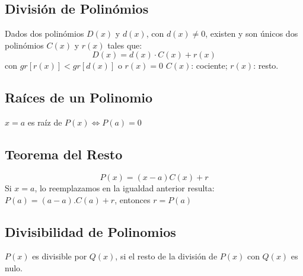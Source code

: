     \subsection{Divisi\'on de Polin\'omios}
    Dados dos polin\'omios $D(x)$ y $d(x)$, con $d(x) \neq 0$, existen y son \'unicos dos polin\'omios $C(x)$ y $r(x)$ tales que: 
     \[ D(x)=d(x) \cdot C(x) + r(x) \]
     con $gr[r(x)] < gr[d(x)]$ o $r(x) = 0$ \newline
     $C(x)$: cociente; $r(x)$: resto.

   \subsection{Ra\'ices de un Polinomio}
   $x=a$ es ra\'iz de $P(x) \Leftrightarrow P(a)=0$ 
   
   \subsection{Teorema del Resto}   
    
    \[ P(x) = (x - a)  C(x) + r \]
    Si $x = a$, lo reemplazamos en la igualdad anterior resulta: 
    $P(a) = (a-a).C(a) + r$, entonces $r = P(a)$ \newline
    
   
   \subsection{Divisibilidad de Polinomios}
   $P(x)$ es divisible por $Q(x)$, si el resto de la divisi\'on de $P(x)$ con $Q(x)$ es nulo.
